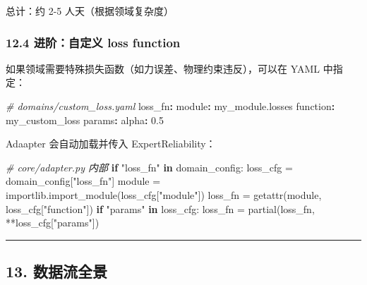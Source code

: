 \documentclass[
  12pt,
]{ctexart}
\newenvironment{Shaded}{}{}
\newcommand{\AttributeTok}[1]{\textcolor[rgb]{0.49,0.56,0.16}{#1}}
\newcommand{\BuiltInTok}[1]{\textcolor[rgb]{0.00,0.50,0.00}{#1}}
\newcommand{\CommentTok}[1]{\textcolor[rgb]{0.38,0.63,0.69}{\textit{#1}}}
\newcommand{\ControlFlowTok}[1]{\textcolor[rgb]{0.00,0.44,0.13}{\textbf{#1}}}
\newcommand{\FloatTok}[1]{\textcolor[rgb]{0.25,0.63,0.44}{#1}}
\newcommand{\FunctionTok}[1]{\textcolor[rgb]{0.02,0.16,0.49}{#1}}
\newcommand{\KeywordTok}[1]{\textcolor[rgb]{0.00,0.44,0.13}{\textbf{#1}}}
\newcommand{\NormalTok}[1]{#1}
\newcommand{\OperatorTok}[1]{\textcolor[rgb]{0.40,0.40,0.40}{#1}}
\newcommand{\StringTok}[1]{\textcolor[rgb]{0.25,0.44,0.63}{#1}}
\begin{document}
总计：约 2-5 人天（根据领域复杂度）

\subsubsection{12.4 进阶：自定义 loss
function}\label{ux8fdbux9636ux81eaux5b9aux4e49-loss-function}

如果领域需要特殊损失函数（如力误差、物理约束违反），可以在 YAML 中指定：

\begin{Shaded}
\begin{Highlighting}[]
\CommentTok{\# domains/custom\_loss.yaml}
\FunctionTok{loss\_fn}\KeywordTok{:}
\AttributeTok{  }\FunctionTok{module}\KeywordTok{:}\AttributeTok{ my\_module.losses}
\AttributeTok{  }\FunctionTok{function}\KeywordTok{:}\AttributeTok{ my\_custom\_loss}
\AttributeTok{  }\FunctionTok{params}\KeywordTok{:}
\AttributeTok{    }\FunctionTok{alpha}\KeywordTok{:}\AttributeTok{ }\FloatTok{0.5}
\end{Highlighting}
\end{Shaded}

Adaapter 会自动加载并传入 ExpertReliability：

\begin{Shaded}
\begin{Highlighting}[]
\CommentTok{\# core/adapter.py 内部}
\ControlFlowTok{if} \StringTok{"loss\_fn"} \KeywordTok{in}\NormalTok{ domain\_config:}
\NormalTok{    loss\_cfg }\OperatorTok{=}\NormalTok{ domain\_config[}\StringTok{"loss\_fn"}\NormalTok{]}
\NormalTok{    module }\OperatorTok{=}\NormalTok{ importlib.import\_module(loss\_cfg[}\StringTok{"module"}\NormalTok{])}
\NormalTok{    loss\_fn }\OperatorTok{=} \BuiltInTok{getattr}\NormalTok{(module, loss\_cfg[}\StringTok{"function"}\NormalTok{])}
    \ControlFlowTok{if} \StringTok{"params"} \KeywordTok{in}\NormalTok{ loss\_cfg:}
\NormalTok{        loss\_fn }\OperatorTok{=}\NormalTok{ partial(loss\_fn, }\OperatorTok{**}\NormalTok{loss\_cfg[}\StringTok{"params"}\NormalTok{])}
\end{Highlighting}
\end{Shaded}

\begin{center}\rule{0.5\linewidth}{0.5pt}\end{center}

\subsection{13. 数据流全景}\label{ux6570ux636eux6d41ux5168ux666f}
\end{document}
